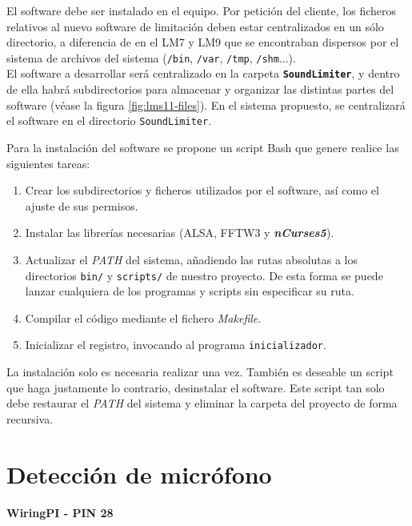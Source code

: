 El software debe ser instalado en el equipo. Por petición del cliente, los ficheros relativos al nuevo software de limitación deben estar centralizados en un sólo directorio, a diferencia de en el \acrshort{LM7} y \acrshort{LM9} que se encontraban dispersos por el sistema de archivos del sistema (\texttt{/bin}, \texttt{/var}, \texttt{/tmp}, \texttt{/shm}...).\\
El software a desarrollar será centralizado en la carpeta \textbf{\texttt{SoundLimiter}}, y dentro de ella habrá subdirectorios para almacenar y organizar las distintas partes del software (véase la figura \ref{fig:lms11-files}). En el sistema propuesto, se centralizará el software en el directorio \texttt{SoundLimiter}.

Para la instalación del software se propone un script Bash que genere realice las siguientes tareas:
\begin{enumerate}
\item Crear los subdirectorios y ficheros utilizados por el software, así como el ajuste de sus permisos.

\item Instalar las librerías necesarias (\acrshort{ALSA}, \acrshort{FFTW}3 y \textit{\textbf{nCurses5}}).

\item Actualizar el \textit{PATH} del sistema, añadiendo las rutas absolutas a los directorios \texttt{bin/} y \texttt{scripts/} de nuestro proyecto. De esta forma se puede lanzar cualquiera de los programas y scripts sin especificar su ruta.

\item Compilar el código mediante el fichero \textit{Makefile}.

\item Inicializar el registro, invocando al programa \texttt{inicializador}.
\end{enumerate}

La instalación solo es necesaria realizar una vez. También es deseable un script que haga justamente lo contrario, desinstalar el software. Este script tan solo debe restaurar el \textit{PATH} del sistema y eliminar la carpeta del proyecto de forma recursiva.

\section{Detección de micrófono}

\begin{flushright}
\textbf{WiringPI - PIN 28}
\end{flushright}

